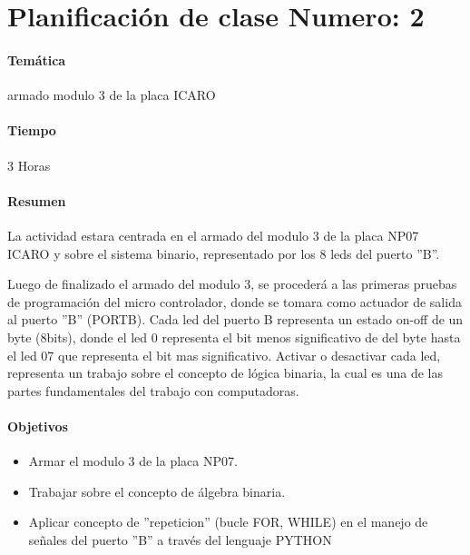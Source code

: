 \chapter*{Planificación de clase Numero: 2}
\subsubsection{Temática}
armado modulo 3 de la placa ICARO

\subsubsection{Tiempo}
3 Horas

\subsubsection{Resumen}

La actividad estara centrada en el armado del modulo 3 de la placa NP07 ICARO y sobre el sistema binario, representado por los 8 leds del puerto ''B''.

Luego de finalizado el armado del modulo 3, se procederá a las primeras pruebas de programación del micro controlador, donde se tomara como actuador de salida al puerto ''B'' (PORTB). Cada led del puerto B representa un estado on-off de un byte (8bits), donde el led 0 representa el bit menos significativo de del byte hasta el led 07 que representa el bit mas significativo. Activar o desactivar cada led, representa un trabajo sobre el concepto de lógica binaria, la cual es una de las partes fundamentales del trabajo con computadoras. 

\subsubsection{Objetivos}
\begin{itemize}
  \item Armar el modulo 3 de la placa NP07.
  \item Trabajar sobre el concepto de álgebra binaria.
  \item Aplicar concepto de ''repeticion'' (bucle FOR, WHILE) en el manejo de señales del puerto ''B'' a través del lenguaje PYTHON

\end{itemize}


